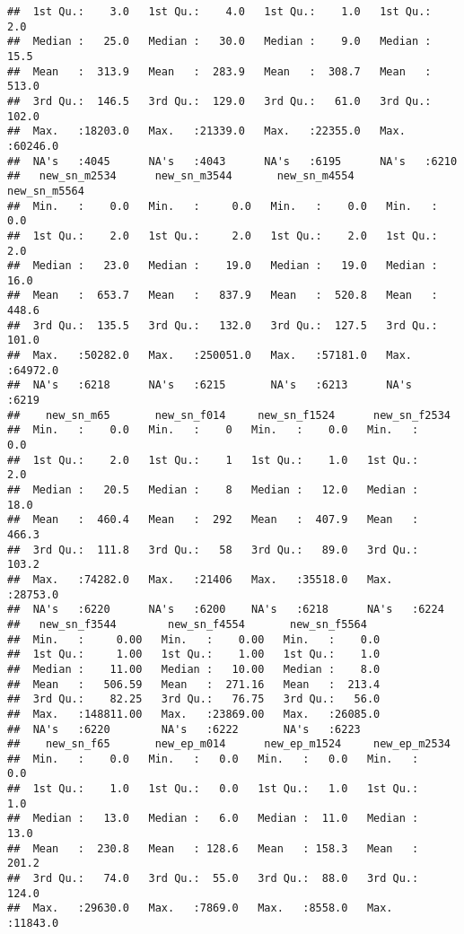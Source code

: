 \documentclass[]{article}
\begin{document}
\begin{verbatim}
##  1st Qu.:    3.0   1st Qu.:    4.0   1st Qu.:    1.0   1st Qu.:    2.0  
##  Median :   25.0   Median :   30.0   Median :    9.0   Median :   15.5  
##  Mean   :  313.9   Mean   :  283.9   Mean   :  308.7   Mean   :  513.0  
##  3rd Qu.:  146.5   3rd Qu.:  129.0   3rd Qu.:   61.0   3rd Qu.:  102.0  
##  Max.   :18203.0   Max.   :21339.0   Max.   :22355.0   Max.   :60246.0  
##  NA's   :4045      NA's   :4043      NA's   :6195      NA's   :6210     
##   new_sn_m2534      new_sn_m3544       new_sn_m4554      new_sn_m5564    
##  Min.   :    0.0   Min.   :     0.0   Min.   :    0.0   Min.   :    0.0  
##  1st Qu.:    2.0   1st Qu.:     2.0   1st Qu.:    2.0   1st Qu.:    2.0  
##  Median :   23.0   Median :    19.0   Median :   19.0   Median :   16.0  
##  Mean   :  653.7   Mean   :   837.9   Mean   :  520.8   Mean   :  448.6  
##  3rd Qu.:  135.5   3rd Qu.:   132.0   3rd Qu.:  127.5   3rd Qu.:  101.0  
##  Max.   :50282.0   Max.   :250051.0   Max.   :57181.0   Max.   :64972.0  
##  NA's   :6218      NA's   :6215       NA's   :6213      NA's   :6219     
##    new_sn_m65       new_sn_f014     new_sn_f1524      new_sn_f2534    
##  Min.   :    0.0   Min.   :    0   Min.   :    0.0   Min.   :    0.0  
##  1st Qu.:    2.0   1st Qu.:    1   1st Qu.:    1.0   1st Qu.:    2.0  
##  Median :   20.5   Median :    8   Median :   12.0   Median :   18.0  
##  Mean   :  460.4   Mean   :  292   Mean   :  407.9   Mean   :  466.3  
##  3rd Qu.:  111.8   3rd Qu.:   58   3rd Qu.:   89.0   3rd Qu.:  103.2  
##  Max.   :74282.0   Max.   :21406   Max.   :35518.0   Max.   :28753.0  
##  NA's   :6220      NA's   :6200    NA's   :6218      NA's   :6224     
##   new_sn_f3544        new_sn_f4554       new_sn_f5564    
##  Min.   :     0.00   Min.   :    0.00   Min.   :    0.0  
##  1st Qu.:     1.00   1st Qu.:    1.00   1st Qu.:    1.0  
##  Median :    11.00   Median :   10.00   Median :    8.0  
##  Mean   :   506.59   Mean   :  271.16   Mean   :  213.4  
##  3rd Qu.:    82.25   3rd Qu.:   76.75   3rd Qu.:   56.0  
##  Max.   :148811.00   Max.   :23869.00   Max.   :26085.0  
##  NA's   :6220        NA's   :6222       NA's   :6223     
##    new_sn_f65       new_ep_m014      new_ep_m1524     new_ep_m2534    
##  Min.   :    0.0   Min.   :   0.0   Min.   :   0.0   Min.   :    0.0  
##  1st Qu.:    1.0   1st Qu.:   0.0   1st Qu.:   1.0   1st Qu.:    1.0  
##  Median :   13.0   Median :   6.0   Median :  11.0   Median :   13.0  
##  Mean   :  230.8   Mean   : 128.6   Mean   : 158.3   Mean   :  201.2  
##  3rd Qu.:   74.0   3rd Qu.:  55.0   3rd Qu.:  88.0   3rd Qu.:  124.0  
##  Max.   :29630.0   Max.   :7869.0   Max.   :8558.0   Max.   :11843.0  

\end{verbatim}
\end{document}
